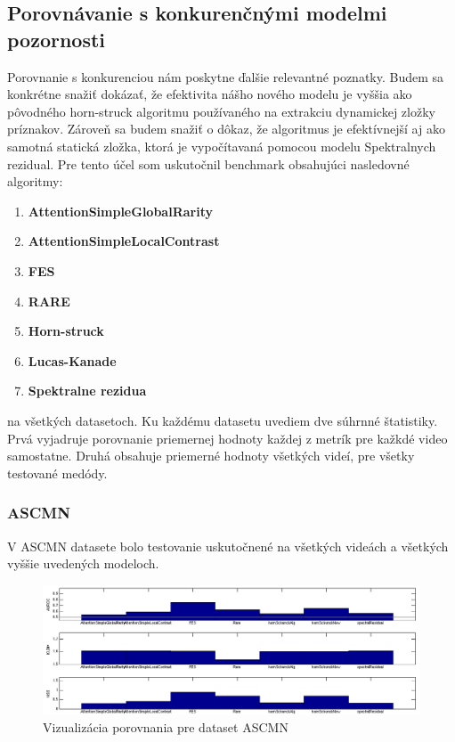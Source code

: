 \subsection{Porovnávanie s konkurenčnými modelmi pozornosti}
Porovnanie s konkurenciou nám poskytne ďalšie relevantné poznatky.
Budem sa konkrétne snažiť dokázať, že efektivita nášho nového modelu je vyššia ako pôvodného horn-struck algoritmu\cite{horn-schunck} používaného na extrakciu dynamickej zložky príznakov.
Zároveň sa budem snažiť o dôkaz, že algoritmus je efektívnejší aj ako samotná statická zložka, ktorá je vypočítavaná pomocou modelu Spektralnych rezidual\cite{spectral-rezidual}.
Pre tento účel som uskutočnil benchmark obsahujúci nasledovné algoritmy:
\begin{enumerate}
  \item\textbf{AttentionSimpleGlobalRarity\cite{global-rarity}}
  \item\textbf{AttentionSimpleLocalContrast\cite{global-rarity}}
  \item\textbf{FES\cite{fes}}
  \item\textbf{RARE\cite{rare-1}}
  \item\textbf{Horn-struck\cite{horn-schunck}}
  \item\textbf{Lucas-Kanade\cite{lucas-kanade}}
  \item\textbf{Spektralne rezidua\cite{spectral-rezidual}}
\end{enumerate}
na všetkých datasetoch.
Ku každému datasetu uvediem dve súhrnné štatistiky.
Prvá vyjadruje porovnanie priemernej hodnoty každej z metrík pre kažkdé video samostatne.
Druhá obsahuje priemerné hodnoty všetkých videí, pre všetky testované medódy.

\subsubsection{ASCMN}
V ASCMN datasete bolo testovanie uskutočnené na všetkých videách a všetkých vyššie uvedených modeloch.

\begin{figure}[H]
  \includegraphics[width=15cm]{pics/porovnanie-accv-global-new.png}
  \caption{Vizualizácia porovnania pre dataset ASCMN\cite{accv}}
\end{figure}

